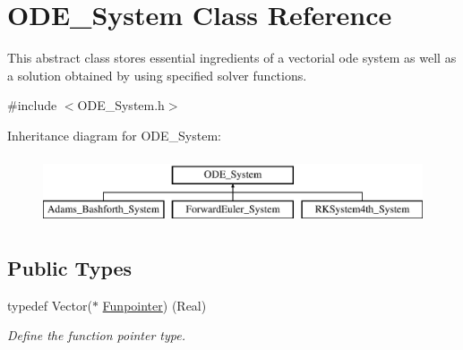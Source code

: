 \hypertarget{class_o_d_e___system}{}\section{O\+D\+E\+\_\+\+System Class Reference}
\label{class_o_d_e___system}


This abstract class stores essential ingredients of a vectorial ode system as well as a solution obtained by using specified solver functions.  




{\ttfamily \#include $<$O\+D\+E\+\_\+\+System.\+h$>$}

Inheritance diagram for O\+D\+E\+\_\+\+System\+:\begin{figure}[H]
\begin{center}
\leavevmode
\includegraphics[height=2.000000cm]{class_o_d_e___system}
\end{center}
\end{figure}
\subsection*{Public Types}
\begin{DoxyCompactItemize}
\item 
\mbox{\label{class_o_d_e___system_a9ff6775dafbba78d49f164174aa7074e}} 
typedef Vector($\ast$ \mbox{\hyperlink{class_o_d_e___system_a9ff6775dafbba78d49f164174aa7074e}{Funpointer}}) (Real)
\begin{DoxyCompactList}\small\item\em Define the function pointer type. \end{DoxyCompactList}\end{DoxyCompactItemize}
